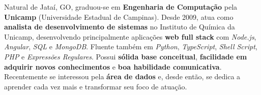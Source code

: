 

\begin{cvparagraph}

Natural de Jataí, GO, graduou-se em \textbf{Engenharia de Computação} pela \textbf{Unicamp} (Universidade Estadual de Campinas). Desde 2009, atua como \textbf{analista de desenvolvimento de sistemas} no Instituto de Química da Unicamp, desenvolvendo principalmente aplicações \textbf{web full stack} com \textit{Node.js}, \textit{Angular}, \textit{SQL} e \textit{MongoDB}. Fluente também em \textit{Python}, \textit{TypeScript}, \textit{Shell Script}, \textit{PHP} e \textit{Expressões Regulares}. Possui \textbf{sólida base conceitual}, \textbf{facilidade em adquirir novos conhecimentos} e \textbf{boa habilidade comunicativa}. Recentemente se interessou pela \textbf{área de dados} e, desde então, se dedica a aprender cada vez mais e transformar seu foco de atuação.
\end{cvparagraph}
